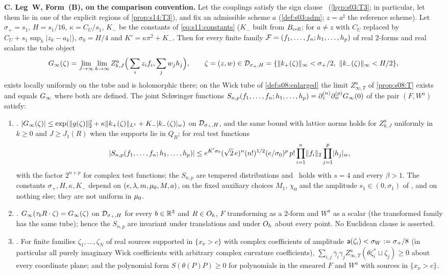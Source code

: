 \begin{theorem}
\smallskip\noindent\textbf{C. Leg~W, Form~(B), on the comparison convention.} Let the couplings satisfy the sign clause \Tthree\ (\cref{hyp:s03:T3}; in particular, let them lie in one of the explicit regions of \cref{prop:s14:T3}), and fix an admissible scheme $a$ (\cref{def:s03:adm}; $z=a^\sharp$ the reference scheme). Let $\sigma_+=s_1$, $H=s_1/16$, $\kappa=C_U/s_1$, $K_-$ be the constants of \eqref{eq:s11:constants} ($K_-$ built from $B_{\rm cell}$; for $a\ne z$ with $C_U$ replaced by $C_U+s_1\sup_k|z_k-a_k|$), $\sigma_0=H/4$ and $K'=\kappa\pi^2+K_-$. Then for every finite family $\mathcal F=(f_1,\dots,f_n;h_1,\dots,h_p)$ of real $2$-forms and real scalars the tube object
\[
\Ginf(\zeta)=\lim_{J\to\infty}\lim_{k\to\infty}Z^a_{k,J}\Big(\sum_iz_if_i,\sum_jw_jh_j\Big),\qquad\zeta=(z,w)\in\Dtube=\{\norm{k_+(\zeta)}_\infty<\sigma_+/2,\ \norm{k_-(\zeta)}_\infty<H/2\},
\]
exists locally uniformly on the tube and is holomorphic there; on the Wick tube of \cref{def:s08:enlarged} the limit $Z^a_{\infty,T}$ of \cref{prop:s08:T} exists and equals $G_\infty$ where both are defined. The joint Schwinger functions $S_{n,p}(f_1,\dots,f_n;h_1,\dots,h_p)=\partial^{(n)}_z\partial^{(p)}_wG_\infty(0)$ of the pair $(F,W^a)$ satisfy:
\begin{enumerate}[label=\textup{(\roman*)},leftmargin=*]
\item \emph{\OSz.} $|G_\infty(\zeta)|\le\exp(\lVert g(\zeta)\rVert_2^2+\kappa\lVert k_+(\zeta)\rVert_{L^1}+K_-\lvert k_-(\zeta)\rvert_{w})$ on $\mathcal D_{\sigma_+,H}$, and the same bound with lattice norms holds for $Z^a_{k,J}$ uniformly in $k\ge0$ and $J\ge J_1(R)$ when the supports lie in $Q_R$; for real test functions
\[
|S_{n,p}(f_1,\dots,f_n;h_1,\dots,h_p)|\le e^{K'\sigma_0}(\sqrt2\,e)^n(n!)^{1/2}(e/\sigma_0)^p\,p!\prod_{i=1}^n\lVert f_i\rVert_2\prod_{j=1}^p\lvert h_j\rvert_{w},
\]
with the factor $2^{n+p}$ for complex test functions; the $S_{n,p}$ are tempered distributions and \Ezz\ holds with $s=4$ and every $\beta>1$. The constants $\sigma_+,H,\kappa,K_-$ depend on $(e,\lambda,m,\mu_0,M,a)$, on the fixed auxiliary choices $M_1$, $\chi_0$ and the amplitude $s_1\in(0,\sigma_1)$ of \Itwo, and on nothing else; they are not uniform in $\mu_0$.
\item \emph{\OSo.} $G_\infty(\tau_bR\cdot\zeta)=G_\infty(\zeta)$ on $\mathcal D_{\sigma_+,H}$ for every $b\in\mathbb R^3$ and $R\in O_h$, $F$ transforming as a $2$-form and $W^a$ as a scalar (the transformed family has the same tube); hence the $S_{n,p}$ are invariant under translations and under $O_h$ about every point. No Euclidean clause is asserted.
\item \emph{\OSt.} For finite families $\zeta_1,\dots,\zeta_N$ of real sources supported in $\{x_\nu>c\}$ with complex coefficients of amplitude $\mathsf a(\zeta_i)<\sigma_W:=\sigma_+/8$ (in particular all purely imaginary Wick coefficients with arbitrary complex curvature coefficients), $\sum_{i,j}\bar\gamma_i\gamma_jZ^a_{\infty,T}(\theta\zeta_i^*\sqcup\zeta_j)\ge0$ about every coordinate plane; and the polynomial form $S(\theta(P)P)\ge0$ for polynomials in the smeared $F$ and $W^a$ with sources in $\{x_\nu>c\}$.

\end{enumerate}
\end{theorem}
